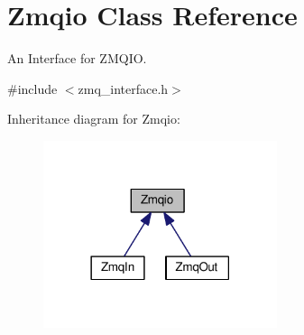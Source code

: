 \hypertarget{classZmqio}{}\section{Zmqio Class Reference}
\label{classZmqio}


An Interface for Z\+M\+Q\+IO.  




{\ttfamily \#include $<$zmq\+\_\+interface.\+h$>$}



Inheritance diagram for Zmqio\+:
\nopagebreak
\begin{figure}[H]
\begin{center}
\leavevmode
\includegraphics[width=194pt]{classZmqio__inherit__graph}
\end{center}
\end{figure}
